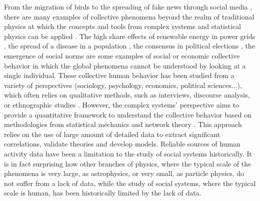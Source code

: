 From the migration of birds \cite{roche-1997} to the spreading of fake news through social media \cite{yamir-2004,vosoughi-2018}, there are many examples of collective phenomena beyond the realm of traditional physics at which the concepts and tools from complex systems and statistical physics can be applied \cite{perc2013evolutionary}. The high share effects of renewable energy in power grids \cite{maria-2023}, the spread of a disease in a population \cite{anderson1991infectious}, the consensus in political elections \cite{anderson-2000}, the emergence of social norms \cite{ellickson-1999} are some examples of social or economic collective behavior in which the global phenomena cannot be understood by looking at a single individual. These collective human behavior has been studied from a variety of perspectives (sociology, psychology, economics, political sciences...), which often relies on qualitative methods, such as interviews, discourse analysis, or ethnographic studies \cite{bryman-2010}. However, the complex systems' perspective aims to provide a quantitative framework to understand the collective behavior based on methodologies from statistical mechanics and network theory \cite{newman-book,barabasi-2013}. This approach relies on the use of large amount of detailed data to extract significant correlations, validate theories and develop models. Reliable sources of human activity data have been a limitation to the study of social systems historically. It is in fact surprising how other branches of physics, where the typical scale of the phenomena is very large, as astrophysics, or very small, as particle physics, do not suffer from a lack of data, while the study of social systems, where the typical scale is human, has been historically limited by the lack of data.

